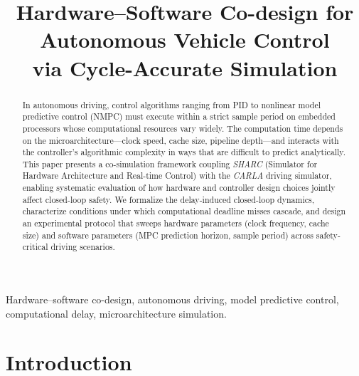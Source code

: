 \documentclass[conference]{IEEEtran}
\begin{document}
\title{Hardware--Software Co-design for Autonomous Vehicle Control\\
  via Cycle-Accurate Simulation}

\author{
}

\maketitle

\begin{abstract}
  In autonomous driving, control algorithms ranging from PID to
  nonlinear model predictive control (NMPC) must execute within a
  strict sample period on embedded processors whose computational
  resources vary widely.  The computation time depends on the
  microarchitecture---clock speed, cache size, pipeline depth---and
  interacts with the controller's algorithmic complexity in ways that
  are difficult to predict analytically.  This paper presents a
  co-simulation framework coupling \emph{SHARC} (Simulator for
  Hardware Architecture and Real-time Control) with the \emph{CARLA}
  driving simulator, enabling systematic evaluation of how hardware
  and controller design choices jointly affect closed-loop safety.  We
  formalize the delay-induced closed-loop dynamics, characterize
  conditions under which computational deadline misses cascade, and
  design an experimental protocol that sweeps hardware parameters
  (clock frequency, cache size) and software parameters (MPC
  prediction horizon, sample period) across safety-critical driving
  scenarios.
\end{abstract}

\begin{IEEEkeywords}
  Hardware--software co-design, autonomous driving, model predictive
  control, computational delay, microarchitecture simulation.
\end{IEEEkeywords}

\section{Introduction}\label{sec:intro}
\end{document}
